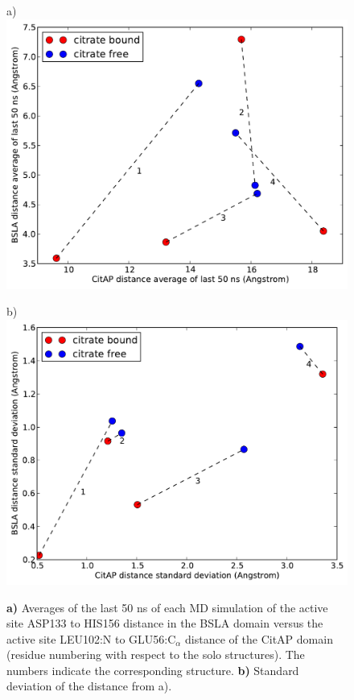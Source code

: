 \documentclass[english, a4paper, 12pt, titlepage, draft]{article}
\begin{document}
\begin{figure}
    \begin{minipage}[]{0.45\linewidth}
        \centering
        a)
        \includegraphics[width=\textwidth]{figures/CitAP_BSLA_distance/BSLA_CitAP_analyzed_with_average_of_last_50_ns.pdf}  
    \end{minipage}
\hspace{0.5cm}
    \begin{minipage}[]{0.45\linewidth}
        \centering
        b)
        \includegraphics[width=\textwidth]{figures/CitAP_BSLA_distance/BSLA_CitAP_analyzed_with_standard_deviation.pdf}  
    \end{minipage}
    \caption{\textbf{a)} Averages of the last 50 ns of each MD simulation of the active site ASP133 to HIS156 distance in the BSLA domain versus the active site LEU102:N to GLU56:C$_{\alpha}$ distance of the CitAP domain (residue numbering with respect to the solo structures).
        The numbers indicate the corresponding structure.
        \textbf{b)} Standard deviation of the distance from a).}
\label{fig:active_site_mean_sd}
\end{figure}     
 
\end{document}
